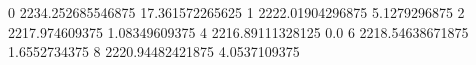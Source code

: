 0 2234.252685546875 17.361572265625
1 2222.01904296875 5.1279296875
2 2217.974609375 1.08349609375
4 2216.89111328125 0.0
6 2218.54638671875 1.6552734375
8 2220.94482421875 4.0537109375

